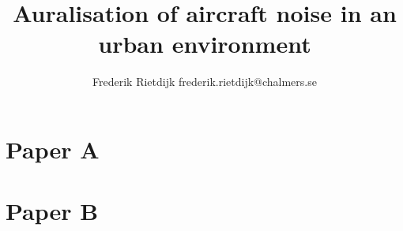 \documentclass[a4paper,10pt]{report}
\title{Auralisation of aircraft noise in an urban environment}
\author{
Frederik Rietdijk \small{frederik.rietdijk@chalmers.se}\\
}
\begin{document}
\maketitle
\thispagestyle{empty}	%

\newpage
\newpage
\newpage
\newpage
\tableofcontents







% 

% 







% 


\newpage
% 
% 
\printbibliography



\appendix
\newpage


\chapter{Paper A}

\chapter{Paper B}


% 
% 
% 
% 
% 
\end{document}
